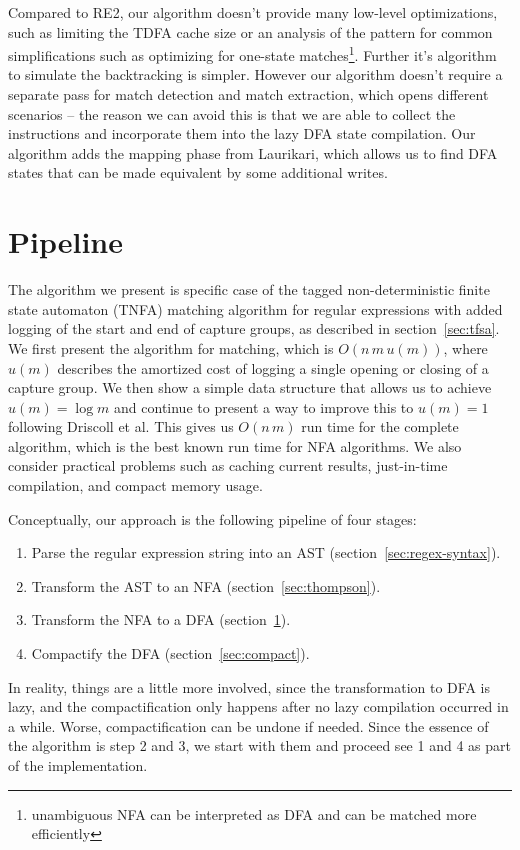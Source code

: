 \documentclass[11pt,a4paper,twoside,openright]{Thesis}
\theoremstyle{definition}
\newcommand{\Secref}[1]{section~\ref{sec:#1}}
\begin{document}
Compared to \textsc{RE2}, our algorithm doesn't provide many low-level optimizations,
such as limiting the TDFA cache size or an analysis of the pattern for common
simplifications such as optimizing for one-state matches\footnote{unambiguous
NFA can be interpreted as DFA and can be matched more efficiently}. Further 
it's algorithm to simulate the backtracking is simpler. However our algorithm
doesn't require a separate pass for match detection and match extraction, which
opens different scenarios -- the reason we can avoid this is that we are able
to collect the instructions and incorporate them into the lazy DFA state
compilation. Our algorithm adds the mapping phase from Laurikari, which allows
us to find DFA states that can be made equivalent by some additional writes.

\section{Pipeline}\label{sec:tnfa}

The algorithm we present is specific case of the tagged non-deterministic
finite state automaton (TNFA) matching algorithm for regular expressions with
added logging of the start and end of capture groups, as described in
\Secref{tfsa}. We first present the algorithm for matching, which is $O(n\, m\,
u(m))$, where $u(m)$ describes the amortized cost of logging a single opening
or closing of a capture group. We then show a
simple data structure that allows us to achieve $u(m) = \log m$ and
continue to present a way to improve this to $u(m) = 1$ following Driscoll et
al\cite{Dris89a}. This gives us $O(n\, m)$ run time for the
complete algorithm, which is the best known run time for NFA algorithms. We 
also consider practical problems such as caching current results, just-in-time
compilation, and compact memory usage.

Conceptually, our approach is the following pipeline of four stages:
\begin{enumerate}
  \item Parse the regular expression string into an AST (\Secref{regex-syntax}).
  \item Transform the AST to an NFA (\Secref{thompson}).
  \item Transform the NFA to a DFA (\Secref{tnfa}).
  \item Compactify the DFA (\Secref{compact}).
\end{enumerate}

In reality, things are a little more involved, since the transformation
to DFA is lazy, and the compactification only happens after no lazy
compilation occurred in a while. Worse, compactification can be
undone if needed. Since the essence of the algorithm is step 2 and 3,
we start with them and proceed see 1 and 4 as part of the implementation.
\end{document}
